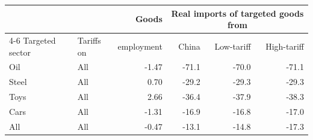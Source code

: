 \begin{tabular}{llrrrr}
\toprule
 & & Goods & \multicolumn{3}{c}{Real imports of targeted goods from} \\
\cmidrule(lr){4-6}
Targeted sector & Tariffs on & employment & China & Low-tariff & High-tariff \\
\midrule
Oil & All & -1.47 & -71.1 & -70.0 & -71.1 \\
\midrule
Steel & All & 0.70 & -29.2 & -29.3 & -29.3 \\
\midrule
Toys & All & 2.66 & -36.4 & -37.9 & -38.3 \\
\midrule
Cars & All & -1.31 & -16.9 & -16.8 & -17.0 \\
\midrule
All & All & -0.47 & -13.1 & -14.8 & -17.3 \\
\bottomrule
\end{tabular}
